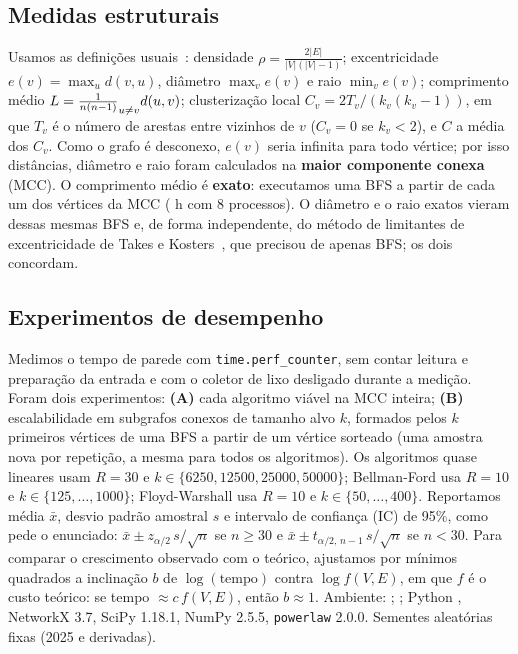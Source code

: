 \documentclass[sigconf]{webmedia}
\let\sum\relax
\begin{document}
\subsection{Medidas estruturais}
Usamos as definições usuais~\cite{newman2010}: densidade
$\rho = \tfrac{2|E|}{|V|(|V|-1)}$;
excentricidade $e(v)=\max_u d(v,u)$, diâmetro $\max_v e(v)$ e raio $\min_v e(v)$;
comprimento médio $L = \frac{1}{n(n-1)}\sum_{u\ne v} d(u,v)$; clusterização local
$C_v = 2T_v/(k_v(k_v-1))$, em que $T_v$ é o número de arestas entre vizinhos de $v$
($C_v=0$ se $k_v<2$), e $C$ a média dos $C_v$. Como o grafo é desconexo, $e(v)$ seria infinita
para todo vértice; por isso distâncias, diâmetro e raio foram calculados na \textbf{maior
componente conexa} (MCC). O comprimento médio é \textbf{exato}: executamos uma BFS a partir de
cada um dos \MCCVertices{} vértices da MCC (\TempoDistHoras{} h com 8 processos). O diâmetro e o
raio exatos vieram dessas mesmas BFS e, de forma independente, do método de limitantes de
excentricidade de Takes e Kosters~\cite{takes2011}, que precisou de apenas \BFSLimitantes{} BFS;
os dois concordam.

\subsection{Experimentos de desempenho}
Medimos o tempo de parede com \texttt{time.perf\_counter}, sem contar leitura e preparação
da entrada e com o coletor de lixo desligado durante a medição. Foram dois experimentos:
\textbf{(A)} cada algoritmo viável na MCC inteira; \textbf{(B)} escalabilidade em subgrafos
conexos de tamanho alvo $k$, formados pelos $k$ primeiros vértices de uma BFS a partir de um
vértice sorteado (uma amostra nova por repetição, a mesma para todos os algoritmos). Os
algoritmos quase lineares usam $R=30$ e $k \in \{6250, 12500, 25000, 50000\}$; Bellman-Ford usa
$R=10$ e $k\in\{125,\dots,1000\}$; Floyd-Warshall usa $R=10$ e $k\in\{50,\dots,400\}$.
Reportamos média $\bar x$, desvio padrão amostral $s$ e intervalo de confiança (IC) de 95\%,
como pede o enunciado: $\bar{x} \pm z_{\alpha/2}\, s/\sqrt{n}$ se $n\ge 30$ e
$\bar{x} \pm t_{\alpha/2,\,n-1}\, s/\sqrt{n}$ se $n<30$. Para comparar o crescimento observado
com o teórico, ajustamos por mínimos quadrados a inclinação $b$ de $\log(\text{tempo})$ contra
$\log f(V,E)$, em que $f$ é o custo teórico: se tempo $\approx c\,f(V,E)$, então $b\approx 1$.
Ambiente: \Hardware{}; \SO{}; Python \PythonVersao{}, NetworkX 3.7, SciPy 1.18.1, NumPy 2.5.5,
\texttt{powerlaw} 2.0.0. Sementes aleatórias fixas (2025 e derivadas).
\end{document}
